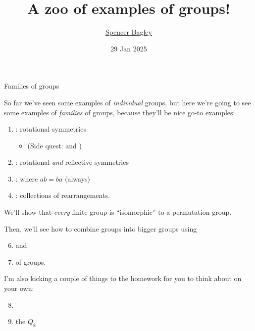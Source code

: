\documentclass[8pt, handout]{beamer}
\newcommand{\Pause}{}
\begin{document}

\title[A zoo of examples of groups!]{A zoo of examples of groups!}

\author[\href{mailto:sbagley@westminsteru.edu}{S. Bagley}]
       {\href{mailto:sbagley@westminsteru.edu}{Spencer Bagley}}


\date[29 Jan 2025]{29 Jan 2025}

\frame{\titlepage}


\begin{frame}{Families of groups} %

  So far we've seen some examples of \textit{individual} groups, but here we're going to see some examples of \textit{families} of groups, because they'll be nice go-to examples:

  \begin{enumerate}
  \item \textbf{}: rotational symmetries
  \begin{itemize}
    \item (Side quest:  and ) \Pause
  \end{itemize}
  \item \textbf{}: rotational \emph{and}
    reflective symmetries \Pause
  \item \textbf{}: where $ab=ba$ (always) \Pause
  \item \textbf{}: collections of
    rearrangements. \Pause
  \end{enumerate}

  We'll show that \emph{every} finite group is ``isomorphic'' to a
  permutation group. \medskip\Pause

  Then, we'll see how to combine groups into bigger groups using
  
  \begin{enumerate}
    \setcounter{enumi}{5}
  \item \textbf{} and 
  \item \textbf{} of groups.  \Pause
  \end{enumerate}

  I'm also kicking a couple of things to the homework for you to think about on your own:

  \begin{enumerate}
    \setcounter{enumi}{7}
    \item \textbf{}
    \item the \textbf{} $Q_8$
  \end{enumerate}


  
  
\end{frame}
\end{document}
